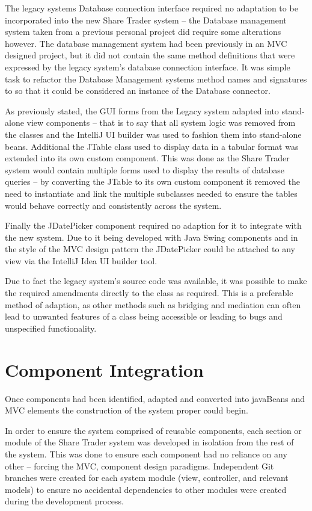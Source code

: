 \documentclass[12pt, a4paper,titlepage]{article}
\begin{document}
The legacy systems Database connection interface required no adaptation to be
incorporated into the new Share Trader system – the Database management system
taken from a previous personal project did require some alterations however.
The database management system had been previously in an MVC designed project,
but it did not contain the same method definitions that were expressed by the
legacy system’s database connection interface. It was simple task to refactor
the Database Management systems method names and signatures to so that it
could be considered an instance of the Database connector.

As previously stated, the GUI forms from the Legacy system adapted into
stand-alone view components – that is to say that all system logic was removed
from the classes and the IntelliJ UI builder was used to fashion them into
stand-alone beans.  Additional the JTable class used to display data in a
tabular format was extended into its own custom component. This was done as
the Share Trader system would contain multiple forms used to display the
results of database queries – by converting the JTable to its own custom
component it removed the need to instantiate and link the multiple subclasses
needed to ensure the tables would behave correctly and consistently across the
system.

Finally the JDatePicker component required no adaption for it to integrate
with the new system. Due to it being developed with Java Swing components and
in the style of the MVC design pattern the JDatePicker could be attached to
any view via the IntelliJ Idea UI builder tool.

Due to fact the legacy system’s source code was available, it was possible to
make the required amendments directly to the class as required. This is a
preferable method of adaption, as other methods such as bridging and mediation
can often lead to unwanted features of a class being accessible or leading to
bugs and unspecified functionality.


\section{Component Integration}
Once components had been identified, adapted and converted into javaBeans and
MVC elements the construction of the system proper could begin.
 
In order to ensure the system comprised of reusable components, each section
or module of the Share Trader system was developed in isolation from the rest
of the system. This was done to ensure  each component had no reliance on any
other – forcing the MVC, component design paradigms.  Independent Git branches
were created for each system module (view, controller, and relevant models) to
ensure no accidental dependencies to other modules were created during the
development process.
\end{document}

